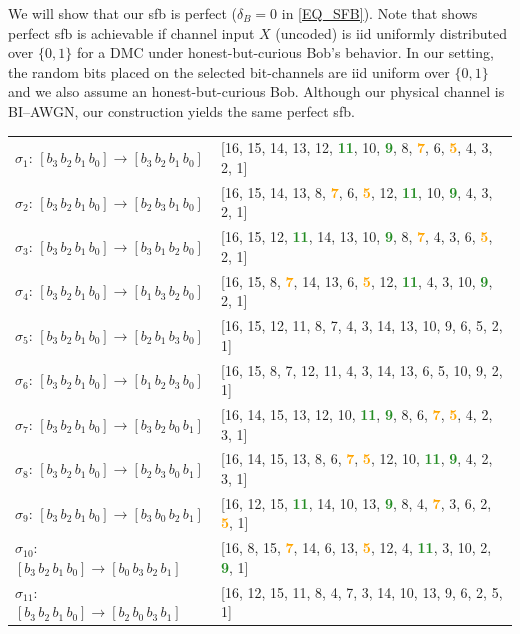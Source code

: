 \documentclass[onecolumn]{IEEEtran} %
\newcommand{\1}{\mathbbm{1}}
\theoremstyle{boldremark}
\newcommand{\g}[1]{\textcolor{ForestGreen}{\textbf{#1}}}
\newcommand{\y}[1]{\textcolor{orange}{\textbf{#1}}}
\begin{document}
We will show that our \gls{sfb} is perfect ($\delta_B=0$ in \eqref{EQ_SFB}). Note that \cite[Remark~5]{AhlswedeCsiszar2009} shows perfect \gls{sfb} is achievable if channel input \(X\) (uncoded) is \gls{iid} uniformly distributed over \(\{0,1\}\) for a DMC under honest-but-curious Bob's behavior. In our setting, the random bits placed on the selected bit-channels are \gls{iid} uniform over \(\{0,1\}\) and we also assume an honest-but-curious Bob. Although our physical channel is BI--AWGN, our construction yields the same perfect \gls{sfb}.


\begin{table}[h]
    \centering
    \begin{normalsize}

\setlength{\arraycolsep}{4pt}
\begin{tabular}{ll}
$\sigma_{1}$: $[b_3\,b_2\,b_1\,b_0]\to[b_3\,b_2\,b_1\,b_0]$ & [16, 15, 14, 13, 12, \g{11}, 10, \g{9}, 8, \y{7}, 6, \y{5}, 4, 3, 2, 1]\\
$\sigma_{2}$: $[b_3\,b_2\,b_1\,b_0]\to[b_2\,b_3\,b_1\,b_0]$ & [16, 15, 14, 13, 8, \y{7}, 6, \y{5}, 12, \g{11}, 10, \g{9}, 4, 3, 2, 1]\\
$\sigma_{3}$: $[b_3\,b_2\,b_1\,b_0]\to[b_3\,b_1\,b_2\,b_0]$ & [16, 15, 12, \g{11}, 14, 13, 10, \g{9}, 8, \y{7}, 4, 3, 6, \y{5}, 2, 1]\\
$\sigma_{4}$: $[b_3\,b_2\,b_1\,b_0]\to[b_1\,b_3\,b_2\,b_0]$ & [16, 15, 8, \y{7}, 14, 13, 6, \y{5}, 12, \g{11}, 4, 3, 10, \g{9}, 2, 1]\\
$\sigma_{5}$: $[b_3\,b_2\,b_1\,b_0]\to[b_2\,b_1\,b_3\,b_0]$ & [16, 15, 12, 11, 8, 7, 4, 3, 14, 13, 10, 9, 6, 5, 2, 1]\\
$\sigma_{6}$: $[b_3\,b_2\,b_1\,b_0]\to[b_1\,b_2\,b_3\,b_0]$ & [16, 15, 8, 7, 12, 11, 4, 3, 14, 13, 6, 5, 10, 9, 2, 1]\\
$\sigma_{7}$: $[b_3\,b_2\,b_1\,b_0]\to[b_3\,b_2\,b_0\,b_1]$ & [16, 14, 15, 13, 12, 10, \g{11}, \g{9}, 8, 6, \y{7}, \y{5}, 4, 2, 3, 1]\\
$\sigma_{8}$: $[b_3\,b_2\,b_1\,b_0]\to[b_2\,b_3\,b_0\,b_1]$ & [16, 14, 15, 13, 8, 6, \y{7}, \y{5}, 12, 10, \g{11}, \g{9}, 4, 2, 3, 1]\\
$\sigma_{9}$: $[b_3\,b_2\,b_1\,b_0]\to[b_3\,b_0\,b_2\,b_1]$ & [16, 12, 15, \g{11}, 14, 10, 13, \g{9}, 8, 4, \y{7}, 3, 6, 2, \y{5}, 1]\\
$\sigma_{10}$: $[b_3\,b_2\,b_1\,b_0]\to[b_0\,b_3\,b_2\,b_1]$ & [16, 8, 15, \y{7}, 14, 6, 13, \y{5}, 12, 4, \g{11}, 3, 10, 2, \g{9}, 1]\\
$\sigma_{11}$: $[b_3\,b_2\,b_1\,b_0]\to[b_2\,b_0\,b_3\,b_1]$ & [16, 12, 15, 11, 8, 4, 7, 3, 14, 10, 13, 9, 6, 2, 5, 1]\\

\end{tabular}
\end{normalsize}
\end{table}
\end{document}
